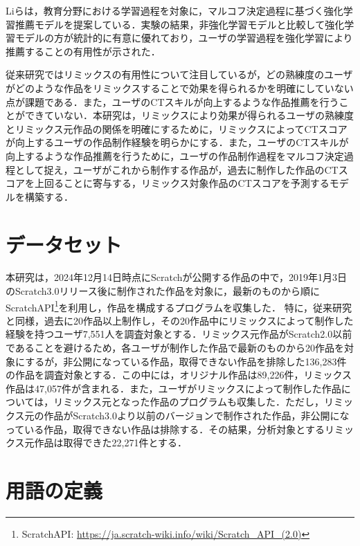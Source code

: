\documentclass[submit,techrep,noauthor]{ipsj}
\begin{document}
Liらは，教育分野における学習過程を対象に，マルコフ決定過程に基づく強化学習推薦モデルを提案している\cite{10.1145/3637528.3671872}．実験の結果，非強化学習モデルと比較して強化学習モデルの方が統計的に有意に優れており，ユーザの学習過程を強化学習により推薦することの有用性が示された．

従来研究ではリミックスの有用性について注目しているが，どの熟練度のユーザがどのような作品をリミックスすることで効果を得られるかを明確にしていない点が課題である．また，ユーザのCTスキルが向上するような作品推薦を行うことができていない．本研究は，リミックスにより効果が得られるユーザの熟練度とリミックス元作品の関係を明確にするために，リミックスによってCTスコアが向上するユーザの作品制作経験を明らかにする．また，ユーザのCTスキルが向上するような作品推薦を行うために，ユーザの作品制作過程をマルコフ決定過程として捉え，ユーザがこれから制作する作品が，過去に制作した作品のCTスコアを上回ることに寄与する，リミックス対象作品のCTスコアを予測するモデルを構築する．


\section{データセット}
\label{sec:dataset}

本研究は，2024年12月14日時点にScratchが公開する作品の中で，2019年1月3日のScratch3.0リリース後に制作された作品を対象に，最新のものから順に
ScratchAPI\footnote{ScratchAPI: \url{https://ja.scratch-wiki.info/wiki/Scratch_API_(2.0)}}を利用し，作品を構成するプログラムを収集した．
特に，従来研究\cite{hashitani2022scratch}と同様，過去に20作品以上制作し，その20作品中にリミックスによって制作した経験を持つユーザ7,551人を調査対象とする．リミックス元作品がScratch2.0以前であることを避けるため，各ユーザが制作した作品で最新のものから20作品を対象にするが，非公開になっている作品，取得できない作品を排除した136,283件の作品を調査対象とする．この中には，オリジナル作品は89,226件，リミックス作品は47,057件が含まれる．また，ユーザがリミックスによって制作した作品については，リミックス元となった作品のプログラムも収集した．ただし，リミックス元の作品がScratch3.0より以前のバージョンで制作された作品，非公開になっている作品，取得できない作品は排除する．その結果，分析対象とするリミックス元作品は取得できた22,271件とする．

\section{用語の定義}
\label{sec:preAnalysis}
\end{document}
